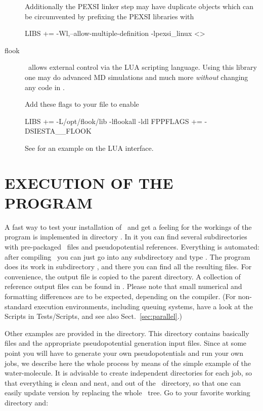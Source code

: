 \begin{description}
  Additionally the PEXSI linker step may have duplicate objects which
  can be circumvented by prefixing the PEXSI libraries with
\begin{shellexample}
  LIBS += -Wl,--allow-multiple-definition -lpexsi_linux <>
\end{shellexample}

  \item[flook]%
  \siesta\ allows external control via the LUA scripting language.
  Using this library one may do advanced MD simulations and much more
  \emph{without} changing any code in \siesta.
  
  Add these flags to your  file to enable 
\begin{shellexample}
  LIBS += -L/opt/flook/lib -lflookall -ldl
  FPPFLAGS += -DSIESTA__FLOOK
\end{shellexample}
  
  See  for an example on the LUA interface.

\end{description}



\section{EXECUTION OF THE PROGRAM}

A fast way to test your installation of \siesta\ and get a feeling for
the workings of the program is implemented in directory
. In it you can find several subdirectories
with pre-packaged \fdflib\ files and pseudopotential references. Everything
is automated: after compiling \siesta\ you can just go into any
subdirectory and type . The program does its work in
subdirectory , and there you can find all the resulting
files. For convenience, the output file is copied to the parent
directory. A collection of reference output files can be found in
. Please note that small numerical and
formatting differences are to be expected, depending on the compiler.
(For non-standard execution environments, including queuing systems,
have a look at the Scripts in Tests/Scripts, and see also
Sect.~\ref{sec:parallel}.)

Other examples are provided in the  directory. This
directory contains basically  files and the appropriate
pseudopotential generation input files. Since at some point you will
have to generate your own pseudopotentials and run your own jobs, we
describe here the whole process by means of the simple example of the
water-molecule. It is advisable to create independent directories for
each job, so that everything is clean and neat, and out of the \siesta\ directory, so that one can easily update version by replacing
the whole \siesta\ tree. Go to your favorite working directory
and:


